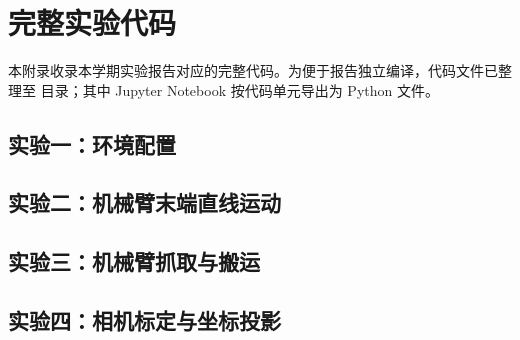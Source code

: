 \clearpage
\section{完整实验代码}

本附录收录本学期实验报告对应的完整代码。为便于报告独立编译，代码文件已整理至  目录；其中 Jupyter Notebook 按代码单元导出为 Python 文件。

\subsection{实验一：环境配置}



\subsection{实验二：机械臂末端直线运动}













\subsection{实验三：机械臂抓取与搬运}



\subsection{实验四：相机标定与坐标投影}

